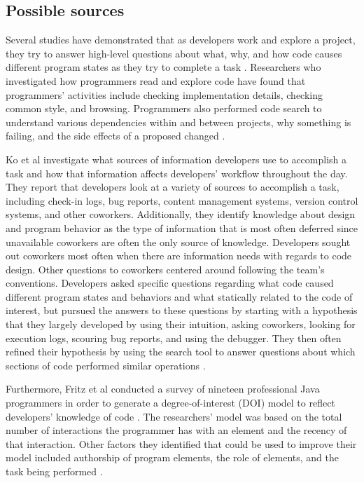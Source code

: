 \documentclass[12pt]{article}
\begin{document}
\subsection{Possible sources}

Several studies have demonstrated that as developers work and explore a project, they try to answer high-level questions about what, why, and how code causes different program states as they try to complete a task \cite{SadowskiEtAl2015, LaTozaMyers2010, LaTozaEtAl2007}. Researchers who investigated how programmers read and explore code have found that programmers' activities include checking implementation details, checking common style, and browsing. Programmers also performed code search to understand various dependencies within and between projects, why something is failing, and the side effects of a proposed changed \cite{SadowskiEtAl2015}. 

Ko et al investigate what sources of information developers use to accomplish a task and how that information affects developers' workflow throughout the day. They report that developers look at a variety of sources to accomplish a task, including check-in logs, bug reports, content management systems, version control systems, and other coworkers. Additionally, they identify knowledge about design and program behavior as the type of information that is most often deferred since unavailable coworkers are often the only source of knowledge. Developers sought out coworkers most often when there are information needs with regards to code design. Other questions to coworkers centered around following the team's conventions. Developers asked specific questions regarding what code caused different program states and behaviors and what statically related to the code of interest, but pursued the answers to these questions by starting with a hypothesis that they largely developed by using their intuition, asking coworkers, looking for execution logs, scouring bug reports, and using the debugger. They then often refined their hypothesis by using the search tool to answer questions about which sections of code performed similar operations \cite{KoEtAl2007}. 

Furthermore, Fritz et al conducted a survey of nineteen professional Java programmers in order to generate a degree-of-interest (DOI) model to reflect developers' knowledge of code \cite{FritzEtAl2007}. The researchers' model was based on the total number of interactions the programmer has with an element and the recency of that interaction. Other factors they identified that could be used to improve their model included authorship of program elements, the role of elements, and the task being performed \cite{FritzEtAl2007}.
\end{document}
